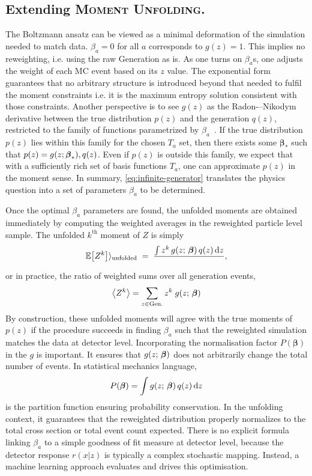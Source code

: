 {{    \subsection{Extending \textsc{Moment Unfolding}.}
        The Boltzmann ansatz can be viewed as a minimal deformation of the simulation needed to match data.
        $\beta_a = 0$ for all $a$ corresponds to $g(z)=1$.
        This implies no reweighting, i.e. using the raw Generation as is.
         As one turns on $\beta_a$s, one adjusts the weight of each MC event based on its $z$ value.
        The exponential form guarantees that no arbitrary structure is introduced beyond that needed to fulfil the moment constraints i.e. it is the maximum entropy solution consistent with those constraints.
        Another perspective is to see $g(z)$ as the Radon-–Nikodym derivative between the true distribution $p(z)$ and the generation $q(z)$, restricted to the family of functions parametrized by $\beta_a$~\cite{NikodymSurRadon, radon_theorie_1913}.
        If the true distribution $p(z)$ lies within this family for the chosen $T_a$ set, then there exists some $\boldsymbol{\beta}_*$ such that $p(z) = g(z; \vb*{\beta}_*),q(z)$.
        Even if $p(z)$ is outside this family, we expect that with a sufficiently rich set of basis functions $T_a$, one can approximate $p(z)$ in the moment sense.
        In summary, \cref{eq:infinite-generator} translates the physics question into a set of parameters $\beta_a$ to be determined.

        Once the optimal $\beta_a$ parameters are found, the unfolded moments are obtained immediately by computing the weighted averages in the reweighted particle level sample.
        The unfolded $k^\text{th}$ moment of $Z$ is simply
        \[
            \mathbb{E}\qty[Z^k] \rangle_{\text{unfolded}} \;=\; \frac{\int z^k\,g(z;\,\vb*\beta)\,q(z)\,\dd z} ~,
        \]
        or in practice, the ratio of weighted sums over all generation events,
        \[
            \ev{Z^k} = \sum_{z\in \text{Gen.}} z^k\;g(z;\, \vb*\beta)
        \]
        By construction, these unfolded moments will agree with the true moments of $p(z)$ if the procedure succeeds in finding $\beta_a$ such that the reweighted simulation matches the data at detector level.
        Incorporating the normalisation factor $P(\boldsymbol{\beta})$ in the \(g\) is important.
        It ensures that $g(z;\,\vb*\beta)$ does not arbitrarily change the total number of events.
        In statistical mechanics language,
        \[
            P(\boldsymbol{\beta})  = \int g(z;\,\vb*\beta)\,q(z)\,\dd z
        \]
        is the partition function ensuring probability conservation.
        In the unfolding context, it guarantees that the reweighted distribution properly normalizes to the total cross section or total event count expected.
        There is no explicit formula linking $\beta_a$ to a simple goodness of fit measure at detector level, because the detector response $r(x|z)$ is typically a complex stochastic mapping.
        Instead, a machine learning approach evaluates and drives this optimisation.
        
}}
